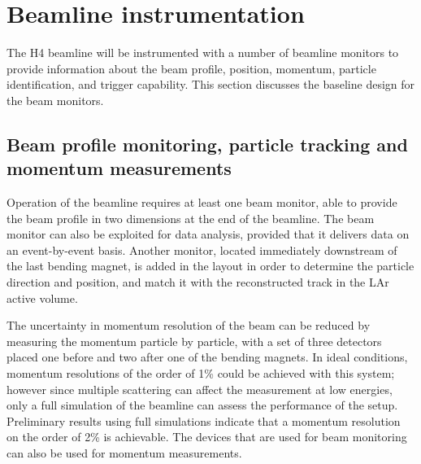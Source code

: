 \section{Beamline instrumentation}
\label{sec:beaminstruments}

The H4 beamline will be instrumented with a number of beamline monitors to provide information 
 about the beam profile, position, momentum, particle identification, and trigger capability. 
This section discusses the baseline design for the beam monitors. 

\subsection{Beam profile monitoring, particle tracking and momentum measurements}

Operation of the beamline requires at least one beam  monitor, able to provide the beam profile in two dimensions at the end of the beamline.   The beam monitor can also be exploited for data analysis, provided that it delivers data on an event-by-event basis. Another monitor, located immediately downstream of the last bending magnet, is added in the layout  in order to determine the particle  direction and position, and match it with the reconstructed track in the LAr active volume.

The uncertainty in momentum resolution of the beam can be reduced by measuring the momentum particle by particle, with a set of three detectors placed one before and two after one of the bending magnets. In ideal conditions, momentum resolutions of the order of 1\% could be achieved with this system; however since multiple scattering can affect the measurement
at low energies, only a full simulation of the beamline can assess the performance of the setup.  
Preliminary results using full simulations indicate that a momentum resolution on the order of  2\% is achievable. The %
devices that are used for beam monitoring can also be used for momentum measurements.
%

